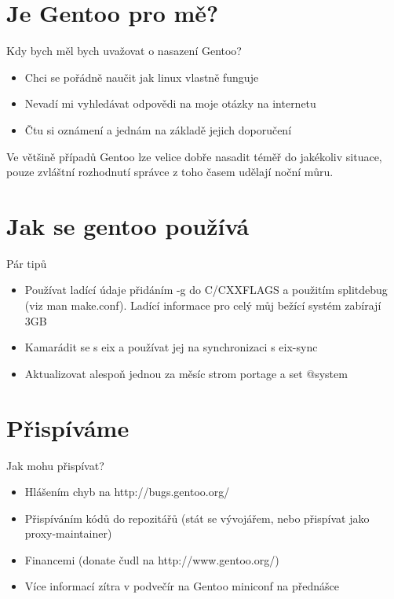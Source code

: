 \documentclass{beamer}
\begin{document}
\section{Je Gentoo pro mě?}
\begin{frame}{Kdy bych měl bych uvažovat o nasazení Gentoo?}
	\begin{itemize}
		\item Chci se pořádně naučit jak linux vlastně funguje
		\item Nevadí mi vyhledávat odpovědi na moje otázky na internetu
		\item Čtu si oznámení a jednám na základě jejich doporučení
	\end{itemize}
	Ve většině případů Gentoo lze velice dobře nasadit téměř do jakékoliv situace, pouze zvláštní rozhodnutí správce z toho časem udělají noční můru.
\end{frame}

\section{Jak se gentoo používá}
\begin{frame}{Pár tipů}
	\begin{itemize}
		\item Používat ladící údaje přidáním -g do C/CXXFLAGS a použitím splitdebug (viz man make.conf). Ladící informace pro celý můj bežící systém zabírají 3GB
		\item Kamarádit se s eix a používat jej na synchronizaci s eix-sync
		\item Aktualizovat alespoň jednou za měsíc strom portage a set @system 
	\end{itemize}
\end{frame}

\section{Přispíváme}
\begin{frame}{Jak mohu přispívat?}
	\begin{itemize}
		\item Hlášením chyb na http://bugs.gentoo.org/
		\item Přispíváním kódů do repozitářů (stát se vývojářem, nebo přispívat jako proxy-maintainer)
		\item Financemi (donate čudl na http://www.gentoo.org/)
		\item Více informací zítra v podvečír na Gentoo miniconf na přednášce 
	\end{itemize}
\end{frame}
\end{document}
